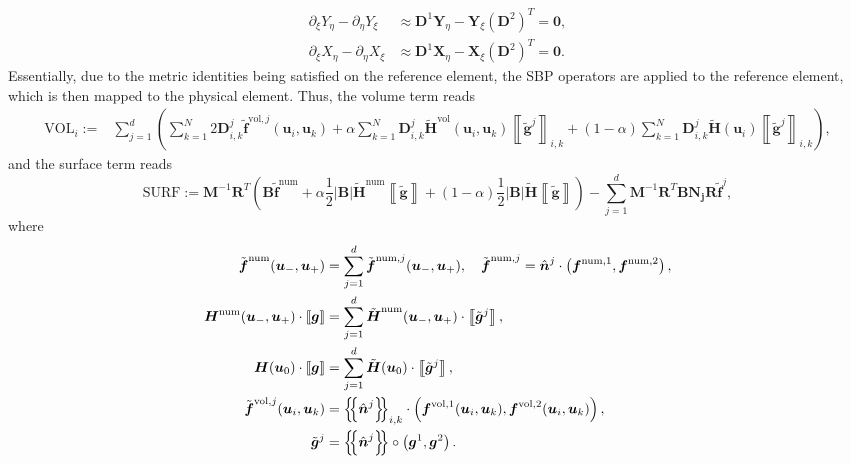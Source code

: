 \documentclass[]{scrartcl}
\newcommand*{\ldblbrace}{\{\mskip-5mu \left \{}
\newcommand*{\rdblbrace}{ \}\mskip-5mu \right \}}
\newcommand{\mean}[1]{\left\ldblbrace #1 \right\rdblbrace}
\newcommand{\mtx}[1]{\boldsymbol{#1}}
\renewcommand{\vec}[1]{\boldsymbol{#1}}
\newcommand{\jump}[1]{\left\llbracket #1  \right\rrbracket}
\theoremstyle{definition}
\begin{document}
\begin{equation}
    \begin{aligned}
    \partial_\xi Y_\eta - \partial_\eta Y_\xi &\approx \mtx{D}^1 \vec{Y}_\eta - \vec{Y}_\xi \left (\mtx{D}^2 \right )^T  = \vec{0}, \\
    \partial_\xi X_\eta - \partial_\eta X_\xi &\approx \mtx{D}^1 \vec{X}_\eta - \vec{X}_\xi \left (\mtx{D}^2 \right )^T  = \vec{0}.
    \end{aligned}
    \label{discrete_metric_identities}
\end{equation}
Essentially, due to the metric identities being satisfied on the reference element, the SBP operators are applied to the reference element, which is then mapped to the physical element.
Thus, the volume term reads
\begin{equation}
    \begin{aligned}
\vec{\mathrm{VOL}}_i :=&  \sum_{j = 1}^d \left ( \sum_{k = 1}^N 2 \mtx{D}^j_{i,k} \tilde{\vec{f}} ^{\mathrm{vol},j}\left (\vec{u}_i, \vec{u}_k \right ) + \alpha \sum_{k = 1}^N \mtx{D}^j_{i,k} \tilde{\vec{H}}^{\mathrm{vol}}\left (\vec{u}_i, \vec{u}_k \right ) \jump{\tilde{\vec{g}}^j}_{i,k} +(1-\alpha)\sum_{k = 1}^N \mtx{D}^j_{i,k} \tilde{\vec{H}}\left (\vec{u}_i\right ) \jump{\tilde{\vec{g}}^j}_{i,k} \right ),
\label{volume_terms_curvilinear}
    \end{aligned}
\end{equation}
and the surface term reads
\begin{equation}
    \vec{\mathrm{SURF}} := \mtx{M}^{-1}\mtx{R}^T \left (\mtx{B}  \vec{\tilde{f}}^{\mathrm{num}} + \alpha \frac{1}{2}|\mtx{B}| \tilde{\mtx{H}}^{\mathrm{num}} \jump{\tilde{\vec{g}}} + (1-\alpha)\frac{1}{2}|\mtx{B}| \tilde{\mtx{H}} \jump{\tilde{\vec{g}}} \right ) - \sum_{j = 1}^d \mtx{M}^{-1} \mtx{R}^T \mtx{B} \mtx{N_j} \mtx{R} \vec{\tilde{f}}^j,
    \label{surface_terms_curvilinear}
\end{equation}
where
\begin{equation}
    \begin{aligned}
\tilde{\vec{f}}^{\mathrm{num}}(\vec{u}_-, \vec{u}_+) &= \sum_{j=1}^{d} \tilde{\vec{f}}^{\mathrm{num},j}(\vec{u}_-, \vec{u}_+), \quad \tilde{\vec{f}}^{\mathrm{num},j} = \hat{\vec{n}}^j \cdot \left (\vec{f}^{\mathrm{num},1}, \vec{f}^{\mathrm{num},2} \right ),\\
\mtx{H}^{\mathrm{num}}(\vec{u}_-, \vec{u}_+)\cdot \jump{\vec{g}} &= \sum_{j=1}^{d} \tilde{\vec{H}}^{\mathrm{num}}(\vec{u}_-, \vec{u}_+) \cdot \jump{\tilde{\vec{g}}^j},\\
\mtx{H}(\vec{u}_0)\cdot \jump{\vec{g}} &= \sum_{j=1}^{d} \tilde{\vec{H}}(\vec{u}_0) \cdot \jump{\tilde{\vec{g}}^j},\\
\tilde{\vec{f}}^{\mathrm{vol},j}(\vec{u}_i, \vec{u}_k) &= \mean{\hat{\vec{n}}^j}_{i,k} \cdot \left (\vec{f}^{\mathrm{vol},1}(\vec{u}_i, \vec{u}_k), \vec{f}^{\mathrm{vol},2}(\vec{u}_i, \vec{u}_k) \right ),\\
\tilde{\vec{g}}^{j} &= \mean{\hat{\vec{n}}^j} \circ \left (\vec{g}^{1}, \vec{g}^{2} \right ).
\end{aligned}
\end{equation}
\end{document}
